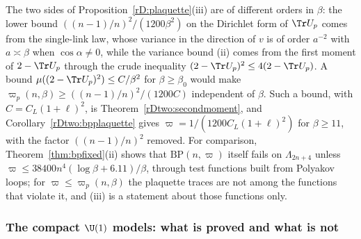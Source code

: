\begin{remark}\label{rD:plaqloss}
The two sides of Proposition~\ref{rD:plaquette}(iii) are of different
orders in $\beta$: the lower bound $((n-1)/n)^2/(1200\beta^2)$ on the
Dirichlet form of $\Tr U_p$ comes from the single-link law, whose variance
in the direction of $v$ is of order $a^{-2}$ with $a\asymp\beta$ when
$\cos\alpha\ne0$, while the variance bound (ii) comes from the first moment
of $2-\Tr U_p$ through the crude inequality $(2-\Tr U_p)^2\le4(2-\Tr U_p)$.
A bound $\mu((2-\Tr U_p)^2)\le C/\beta^2$ for $\beta\ge\beta_0$ would make
$\varpi_p(n,\beta)\ge((n-1)/n)^2/(1200C)$ independent of $\beta$. Such a
bound, with $C=C_L(1+\ell)^2$, is Theorem~\ref{rDtwo:secondmoment},
and Corollary~\ref{rDtwo:bpplaquette} gives $\varpi=1/(1200C_L(1+\ell)^2)$
for $\beta\ge11$, with the factor $((n-1)/n)^2$ removed. For comparison,
Theorem~\ref{thm:bpfixed}(ii) shows that $\mathrm{BP}(n,\varpi)$ itself
fails on $\Lambda_{2n+4}$ unless $\varpi\le38400n^4(\log\beta+6.11)/\beta$,
through test functions built from Polyakov loops; for $\varpi\le\varpi_p(n,
\beta)$ the plaquette traces are not among the functions that violate it,
and (iii) is a statement about those functions only.
\end{remark}

\subsubsection{The compact $\U(1)$ models: what is proved and what is not}

